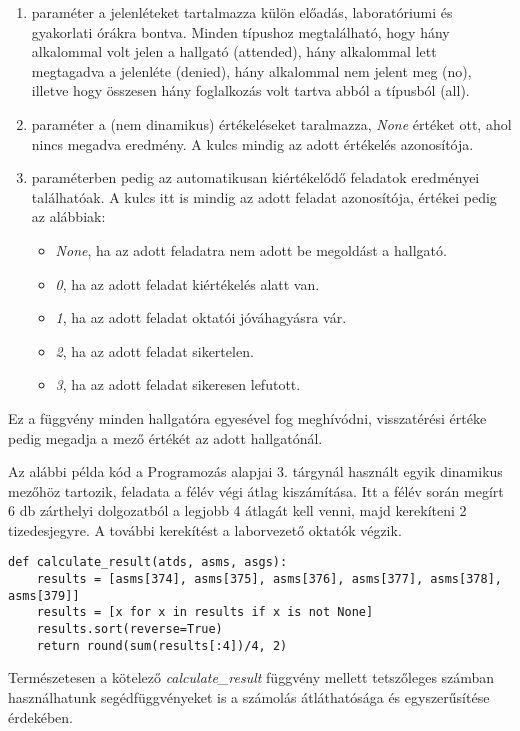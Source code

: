 \begin{enumerate}
    \item paraméter a jelenléteket tartalmazza külön előadás, laboratóriumi és gyakorlati órákra bontva. Minden típushoz megtalálható, hogy hány alkalommal volt jelen a hallgató (attended), hány alkalommal lett megtagadva a jelenléte (denied), hány alkalommal nem jelent meg (no), illetve hogy összesen hány foglalkozás volt tartva abból a típusból (all).
    \item paraméter a (nem dinamikus) értékeléseket taralmazza, \textit{None} értéket ott, ahol nincs megadva eredmény. A kulcs mindig az adott értékelés azonosítója.
    \item paraméterben pedig az automatikusan kiértékelődő feladatok eredményei találhatóak. A kulcs itt is mindig az adott feladat azonosítója, értékei pedig az alábbiak: 
    \begin{itemize}
        \item \textit{None}, ha az adott feladatra nem adott be megoldást a hallgató.
        \item \textit{0}, ha az adott feladat kiértékelés alatt van.
        \item \textit{1}, ha az adott feladat oktatói jóváhagyásra vár.
        \item \textit{2}, ha az adott feladat sikertelen.
        \item \textit{3}, ha az adott feladat sikeresen lefutott.
    \end{itemize}
\end{enumerate}

Ez a függvény minden hallgatóra egyesével fog meghívódni, visszatérési értéke pedig megadja a mező értékét az adott hallgatónál.

Az alábbi példa kód a Programozás alapjai 3. tárgynál használt egyik dinamikus mezőhöz tartozik, feladata a félév végi átlag kiszámítása. Itt a félév során megírt 6 db zárthelyi dolgozatból a legjobb 4 átlagát kell venni, majd kerekíteni 2 tizedesjegyre. A további kerekítést a laborvezető oktatók végzik.

\begin{lstlisting}
def calculate_result(atds, asms, asgs):
    results = [asms[374], asms[375], asms[376], asms[377], asms[378], asms[379]]
    results = [x for x in results if x is not None]
    results.sort(reverse=True)
    return round(sum(results[:4])/4, 2)
\end{lstlisting}

Természetesen a kötelező \textit{calculate\_result} függvény mellett tetszőleges számban használhatunk segédfüggvényeket is a számolás átláthatósága és egyszerűsítése érdekében.

